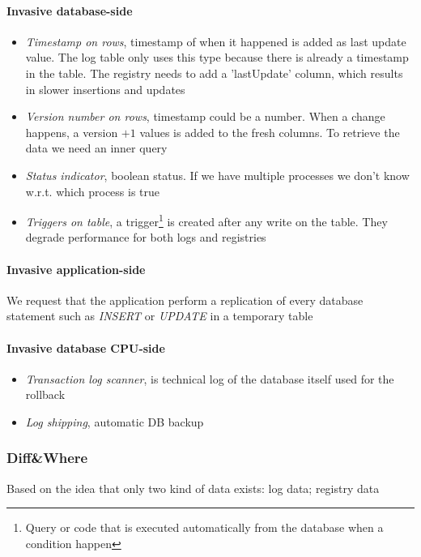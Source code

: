 \paragraph{Invasive database-side}
\begin{itemize}
    \item \textit{Timestamp on rows}, timestamp of when it happened is added as last update value. The log table only uses this type because there is already a timestamp in the table. The registry needs to add a 'lastUpdate' column, which results in slower insertions and updates
    \item \textit{Version number on rows}, timestamp could be a number. When a change happens, a version $+1$ values is added to the fresh columns. To retrieve the data we need an inner query
    \item \textit{Status indicator}, boolean status. If we have multiple processes we don't know w.r.t. which process is true
    \item \textit{Triggers on table}, a trigger\footnote{Query or code that is executed automatically from the database when a condition happen} is created after any write on the table. They degrade performance for both logs and registries
\end{itemize}

\paragraph{Invasive application-side}
We request that the application perform a replication of every database statement such as \textit{INSERT} or \textit{UPDATE} in a temporary table

\paragraph{Invasive database CPU-side}
\begin{itemize}
    \item \textit{Transaction log scanner}, is technical log of the database itself used for the rollback
    \item \textit{Log shipping}, automatic DB backup
\end{itemize}

\subsubsection{Diff\&Where}
Based on the idea that only two kind of data exists: log data; registry data

